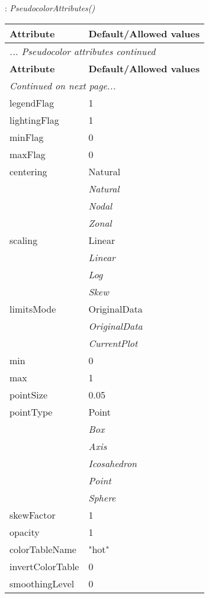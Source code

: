 \documentclass[10pt,a4paper]{report}
\begin{document}
\newpage

{}
: {\it PseudocolorAttributes() }\\[-3mm]

\begin{longtable}{ll}
{\bf Attribute} & {\bf Default/Allowed values} \\
\hline \hline
\endfirsthead
\multicolumn{2}{l}{{\it ... Pseudocolor attributes continued}} \\
{\bf Attribute} & {\bf Default/Allowed values} \\
\hline \hline
\endhead
\hline
\multicolumn{2}{l}{{\it Continued on next page...}} \\
\endfoot
\hline
\endlastfoot

legendFlag  &  1 \\
lightingFlag  &  1 \\
minFlag  &  0 \\
maxFlag  &  0 \\
centering  &  Natural   \\
 & {\it  Natural} \\
 & {\it  Nodal} \\
 & {\it  Zonal} \\
scaling  &  Linear   \\
 & {\it  Linear} \\
 & {\it  Log} \\
 & {\it  Skew} \\
limitsMode  &  OriginalData   \\
 & {\it  OriginalData} \\
 & {\it  CurrentPlot} \\
min  &  0 \\
max  &  1 \\
pointSize  &  0.05 \\
pointType  &  Point   \\
 & {\it  Box} \\
 & {\it  Axis} \\
 & {\it  Icosahedron} \\
 & {\it  Point} \\
 & {\it  Sphere} \\
skewFactor  &  1 \\
opacity  &  1 \\
colorTableName  &  "hot" \\
invertColorTable  &  0 \\
smoothingLevel  &  0 \\

\end{longtable}
\end{document}
